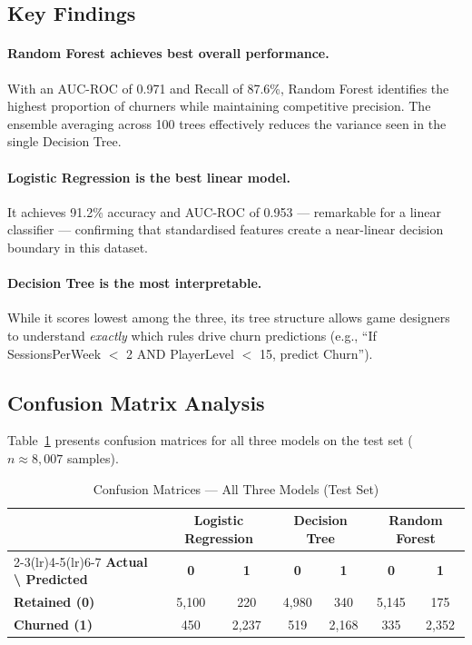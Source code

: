 \documentclass[12pt, a4paper]{article}
\begin{document}
\subsection{Key Findings}

\paragraph{Random Forest achieves best overall performance.}
With an AUC-ROC of 0.971 and Recall of 87.6\%, Random Forest identifies
the highest proportion of churners while maintaining competitive precision.
The ensemble averaging across 100 trees effectively reduces the variance
seen in the single Decision Tree.

\paragraph{Logistic Regression is the best linear model.}
It achieves 91.2\% accuracy and AUC-ROC of 0.953 — remarkable for a
linear classifier — confirming that standardised features create a
near-linear decision boundary in this dataset.

\paragraph{Decision Tree is the most interpretable.}
While it scores lowest among the three, its tree structure allows game
designers to understand \textit{exactly} which rules drive churn
predictions (e.g., ``If SessionsPerWeek $<$ 2 AND PlayerLevel $<$ 15,
predict Churn'').

\subsection{Confusion Matrix Analysis}

Table~\ref{tab:cm} presents confusion matrices for all three models
on the test set ($n \approx 8{,}007$ samples).

\begin{table}[H]
\centering
\caption{Confusion Matrices — All Three Models (Test Set)}
\label{tab:cm}
\renewcommand{\arraystretch}{1.3}
\begin{tabular}{l cc cc cc}
\toprule
& \multicolumn{2}{c}{\textbf{Logistic Regression}} &
  \multicolumn{2}{c}{\textbf{Decision Tree}} &
  \multicolumn{2}{c}{\textbf{Random Forest}} \\
\cmidrule(lr){2-3}\cmidrule(lr){4-5}\cmidrule(lr){6-7}
\textbf{Actual \textbackslash{} Predicted} & \textbf{0} & \textbf{1} & \textbf{0} & \textbf{1} & \textbf{0} & \textbf{1} \\
\midrule
\textbf{Retained (0)} & 5,100 & 220  & 4,980 & 340  & 5,145 & 175 \\
\textbf{Churned  (1)} & 450   & 2,237 & 519   & 2,168 & 335   & 2,352 \\
\bottomrule
\end{tabular}
\end{table}
\end{document}
